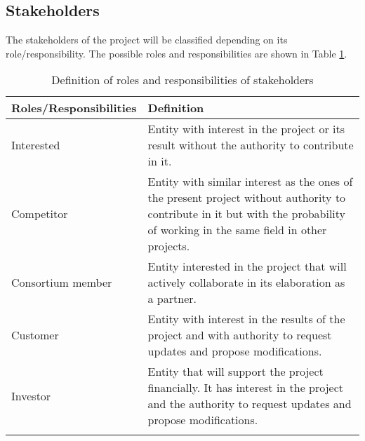 \subsection{Stakeholders}
The stakeholders of the project will be classified depending on its role/responsibility. The possible roles and responsibilities are shown in Table \ref{table_definicionesobvias}.

\begin{center}

\begin{longtable}{lp{8cm}}
\toprule[2pt]
\textbf{Roles/Responsibilities}& \textbf{Definition } \\ \midrule[1.5pt]
Interested&Entity with interest in the project or its result without the authority to contribute in it.\\
\hline
Competitor&Entity with similar interest as the ones of the present project without authority to contribute in it but with the probability of working in the same field in other projects.\\
 \hline
Consortium member&Entity interested in the project that will actively collaborate in its elaboration as a partner.\\
\hline
Customer&Entity with interest in the results of the project and with authority to request updates and propose modifications.\\
\hline
Investor&Entity that will support the project financially. It has interest in the project and the authority to request updates and propose modifications.\\

 \bottomrule[2pt]

\caption{Definition of roles and responsibilities of stakeholders}
\label{table_definicionesobvias}
\end{longtable}

\end{center}

